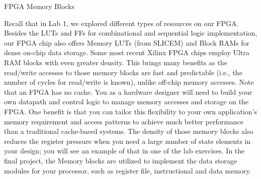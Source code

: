 \documentclass[11pt]{article}
\makeatletter
\renewcommand{\section}
{\@startsection {section}{1}{0pt}
 {-2ex}
 {1ex}
 {\bfseries\Large}}
\makeatother
\begin{document}
\section{FPGA Memory Blocks}

Recall that in Lab 1, we explored different types of resources on our FPGA. Besides the LUTs and FFs for combinational and sequential logic implementation, our FPGA chip also offers Memory LUTs (from SLICEM) and Block RAMs for dense on-chip data storage. Some most recent Xilinx FPGA chips employ Ultra RAM blocks with even greater density. This brings many benefits as the read/write accesses to those memory blocks are fast and predictable (i.e., the number of cycles for read/write is known), unlike off-chip memory accesses. Note that an FPGA has no cache. You as a hardware designer will need to build your own datapath and control logic to manage memory accesses and storage on the FPGA. One benefit is that you can tailor this flexibility to your own application's memory requirement and access patterns to achieve much better performance than a traditional cache-based systems. The density of those memory blocks also reduces the register pressure when you need a large number of state elements in your design; you will see an example of that in one of the lab exercises. In the final project, the Memory blocks are utilized to implement the data storage modules for your processor, such as register file, instructional and data memory.
\end{document}
